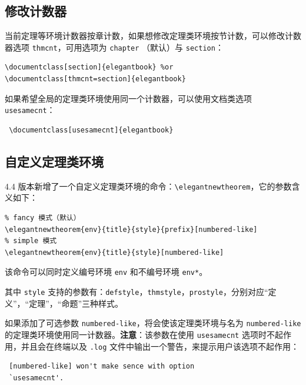 \documentclass[lang=cn,newtx,10pt,scheme=chinese,pad,twocol]{zznote}
\begin{document}
\subsection{修改计数器}

当前定理等环境计数器按章计数，如果想修改定理类环境按节计数，可以修改计数器选项 \lstinline{thmcnt}，可用选项为 \lstinline{chapter} （默认）与 \lstinline{section}：

\begin{lstlisting}
\documentclass[section]{elegantbook} %or
\documentclass[thmcnt=section]{elegantbook}
\end{lstlisting}

如果希望全局的定理类环境使用同一个计数器，可以使用文档类选项 \lstinline{usesamecnt}：

\begin{lstlisting}
 \documentclass[usesamecnt]{elegantbook}
\end{lstlisting}

\subsection{自定义定理类环境}

4.4 版本新增了一个自定义定理类环境的命令：\lstinline|\elegantnewtheorem|，它的参数含义如下：

\begin{lstlisting}
% fancy 模式（默认）
\elegantnewtheorem{env}{title}{style}{prefix}[numbered-like]
% simple 模式
\elegantnewtheorem{env}{title}{style}[numbered-like]
\end{lstlisting}
该命令可以同时定义编号环境 \lstinline|env| 和不编号环境 \lstinline|env*|。

其中 \lstinline|style| 支持的参数有：\lstinline|defstyle|，\lstinline|thmstyle|，\lstinline|prostyle|，分别对应“定义”，“定理”，“命题”三种样式。

如果添加了可选参数 \lstinline{numbered-like}，将会使该定理类环境与名为 \lstinline{numbered-like} 的定理类环境使用同一计数器。\textbf{注意}：该参数在使用 \lstinline{usesamecnt} 选项时不起作用，并且会在终端以及 \lstinline{.log} 文件中输出一个警告，来提示用户该选项不起作用：

\begin{lstlisting}
 [numbered-like] won't make sence with option
 `usesamecnt'.
\end{lstlisting}
\end{document}
